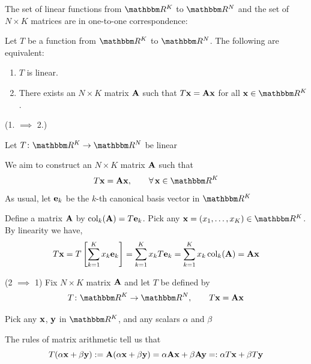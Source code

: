 \begin{frame}
    
    \vspace{.7em}
    The set of linear functions from $\RR^K$ to
    $\RR^N$ and the set of $N \times K$ matrices are in one-to-one correspondence:
    
    \vspace{.7em}
    \Thm{\eqref{ET-t:lmaeq}}
    Let $T$ be a function from $\RR^K$ to $\RR^N$. The following are
    equivalent:
    \begin{enumerate}
        \item $T$ is linear.
        \item There exists an $N \times K$ matrix $\mathbf A$ such that $T{\mathbf x}
            = \mathbf A {\mathbf x}$ for all $\boldx \in \RR^K$.
    \end{enumerate}
\end{frame}

\begin{frame}

    \vspace{2em}
    \Prf (1. $\implies$ 2.)
    
    Let $T \colon \RR^K \to \RR^N$ be linear
    
    We aim to construct an $N \times K$ matrix $\mathbf A$ such that
    $$ T\boldx = \boldA \boldx, \qquad \forall \, \boldx \in \RR^K $$
    As usual, let
    ${\mathbf e}_k$ be the $k$-th canonical basis vector in $\RR^K$
    
    Define a matrix $\mathbf A$ by $\operatorname{col}_k(\mathbf A) = T{\mathbf e}_k$. Pick any $\boldx = (x_1, \ldots, x_K) \in \RR^K$. By linearity we have,
    \begin{equation*}
        T{\mathbf x} 
        = T \left[\sum_{k=1}^K x_k {\mathbf e}_k \right]
        = \sum_{k=1}^K x_k T {\mathbf e}_k
        = \sum_{k=1}^K x_k \operatorname{col}_k(\mathbf A)
        = \mathbf A {\mathbf x}
    \end{equation*}
    
\end{frame}

\begin{frame}
    
    \vspace{2em}
    \Prf (2 $\implies$ 1)
    Fix $N \times K$ matrix $\mathbf A$ and let $T$ be defined by
    \begin{equation*}
        T \colon \RR^K \to \RR^N, 
        \qquad
        T\boldx = \boldA \boldx
    \end{equation*}

    Pick any ${\mathbf x}$, ${\mathbf y}$ in $\RR^K$, and any scalars $\alpha$ and $\beta$
     
    \vspace{.7em} 
    The rules of matrix arithmetic tell us that
    \begin{equation*}
        T(\alpha {\mathbf x} + \beta {\mathbf y}) 
        := \mathbf A (\alpha {\mathbf x} + \beta {\mathbf y})
        = \alpha \mathbf A {\mathbf x}  + \beta \mathbf A {\mathbf y}
        =: \alpha T{\mathbf x} + \beta T{\mathbf y} 
    \end{equation*}
    
\end{frame}

